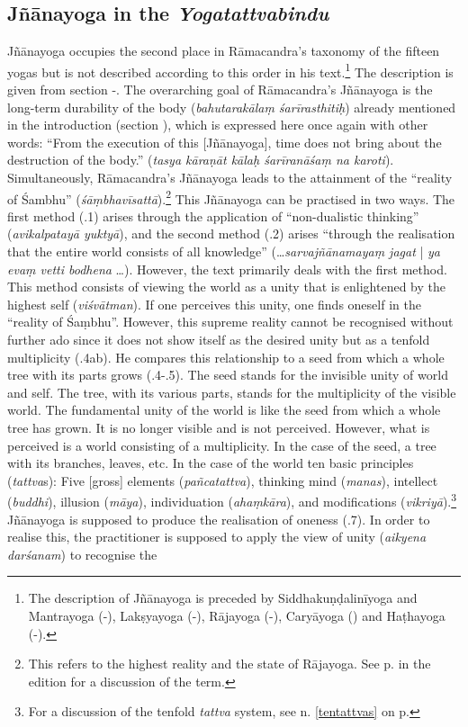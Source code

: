 \subsection{Jñānayoga in the \textit{Yogatattvabindu}}
\label{Jnanayogaintro2}
Jñānayoga occupies the second place in Rāmacandra's taxonomy of the fifteen yogas but is not described according to this order in his text.\footnote{The description of Jñānayoga is preceded by Siddhakuṇḍalinīyoga and Mantrayoga (-), Lakṣyayoga (-), Rājayoga (-), Caryāyoga () and Haṭhayoga (-).} The description is given from section -. The overarching goal of Rāmacandra's Jñānayoga is the long-term durability of the body (\textit{bahutarakālaṃ śarīrasthitiḥ}) already mentioned in the introduction (section ), which is expressed here once again with other words: ``From the execution of this [Jñānayoga], time does not bring about the destruction of the body.'' (\textit{tasya kāraṇāt kālaḥ śarīranāśaṃ na karoti}). Simultaneously, Rāmacandra's Jñānayoga leads to the attainment of the ``reality of Śambhu'' (\textit{śāṃbhavīsattā}).\footnote{This refers to the highest reality and the state of Rājayoga. See p.\pageref{jnanayogatrans1} in the edition for a discussion of the term.} This Jñānayoga can be practised in two ways. The first method (.1) arises through the application of ``non-dualistic thinking'' (\textit{avikalpatayā yuktyā}), and the second method (.2) arises ``through the realisation that the entire world consists of all knowledge'' (\ldots \textit{sarvajñānamayaṃ jagat} | \textit{ya evaṃ vetti bodhena} \ldots). However, the text primarily deals with the first method. This method consists of viewing the world as a unity that is enlightened by the highest self (\textit{viśvātman}). If one perceives this unity, one finds oneself in the ``reality of Śaṃbhu''. However, this supreme reality cannot be recognised without further ado since it does not show itself as the desired unity but as a tenfold multiplicity (.4ab). He compares this relationship to a seed from which a whole tree with its parts grows (.4-.5). The seed stands for the invisible unity of world and self. The tree, with its various parts, stands for the multiplicity of the visible world. The fundamental unity of the world is like the seed from which a whole tree has grown. It is no longer visible and is not perceived. However, what is perceived is a world consisting of a multiplicity. In the case of the seed, a tree with its branches, leaves, etc. In the case of the world ten basic principles (\textit{tattva}s): Five [gross] elements (\textit{pañcatattva}), thinking mind (\textit{manas}), intellect (\textit{buddhi}), illusion (\textit{māya}), individuation (\textit{ahaṃkāra}), and modifications (\textit{vikriyā}).\footnote{For a discussion of the tenfold \textit{tattva} system, see n. \ref{tentattvas} on p. \pageref{tentattvas}} Jñānayoga is supposed to produce the realisation of oneness (.7). In order to realise this, the practitioner is supposed to apply the view of unity (\textit{aikyena darśanam}) to recognise the 